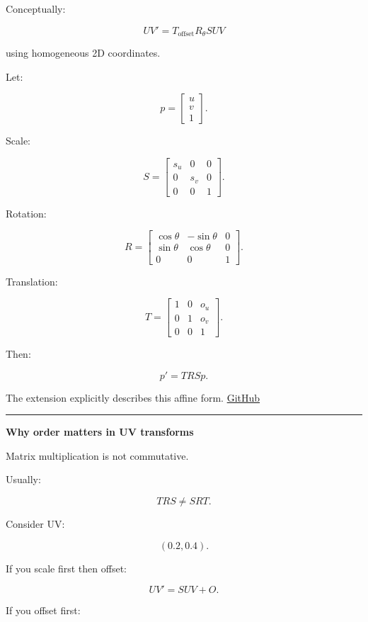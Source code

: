 Conceptually:

\[
\boxed{
UV'
=
T_{\text{offset}}
R_{\theta}
S
UV
}
\]

using homogeneous 2D coordinates.

Let:

\[
p=
\begin{bmatrix}
u\\v\\1
\end{bmatrix}.
\]

Scale:

\[
S=
\begin{bmatrix}
s_u&0&0\\
0&s_v&0\\
0&0&1
\end{bmatrix}.
\]

Rotation:

\[
R=
\begin{bmatrix}
\cos\theta&-\sin\theta&0\\
\sin\theta&\cos\theta&0\\
0&0&1
\end{bmatrix}.
\]

Translation:

\[
T=
\begin{bmatrix}
1&0&o_u\\
0&1&o_v\\
0&0&1
\end{bmatrix}.
\]

Then:

\[
\boxed{
p'=TRSp.
}
\]

The extension explicitly describes this affine form. \href{https://github.com/KhronosGroup/glTF/blob/main/extensions/2.0/Khronos/KHR_texture_transform/README.md?utm_source=chatgpt.com}{GitHub}

\begin{center}\rule{0.5\linewidth}{0.5pt}\end{center}

\textbf{Why order matters in UV transforms}

Matrix multiplication is not commutative.

Usually:

\[
TRS
\neq
SRT.
\]

Consider UV:

\[
(0.2,0.4).
\]

If you scale first then offset:

\[
UV'=S UV+O.
\]

If you offset first:

